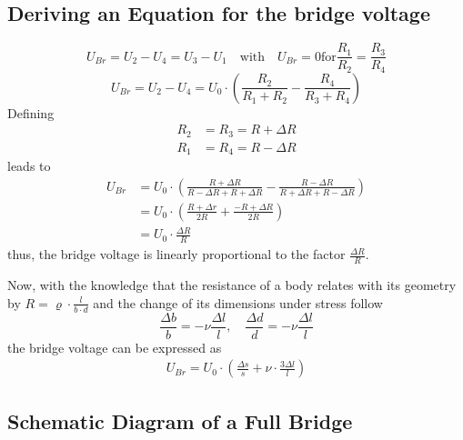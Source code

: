         \subsection{Deriving an Equation for the bridge voltage}\label{sec:A4 equation for full bridge circuit}%
            \begin{equation}
                U_{Br} = U_2 - U_4 = U_3 - U_1 \quad \text{with} \quad U_{Br} = 0 \text{for} \frac{R_1}{R_2} = \frac{R_3}{R_4}
            \end{equation}
            \begin{equation}
                U_{Br} = U_2 - U_4 = U_0 \cdot \left(\frac{R_2}{R_1 + R_2} - \frac{R_4}{R_3 + R_4}\right)
            \end{equation}
            Defining
            \begin{align}
                R_2 &= R_3 = R + \Delta R \\
                R_1 &= R_4 = R - \Delta R
            \end{align}
            leads to
            \begin{align}
                U_{Br}  &= U_0 \cdot \left(\frac{R + \Delta R}{R - \Delta R + R + \Delta R} - \frac{R - \Delta R}{R + \Delta R + R - \Delta R}\right) \nonumber \\
                        &= U_0 \cdot \left(\frac{R+\Delta r}{2R} + \frac{-R + \Delta R}{2R}\right) \nonumber \\
                        &= U_0 \cdot \frac{\Delta R}{R}
                \label{eq:Ubr and delta R}
            \end{align}
            thus, the bridge voltage is linearly proportional to the factor \( \frac{\Delta R}{R} \).\par
            Now, with the knowledge that the resistance of a body relates with its geometry by
            \( R = \varrho \cdot \frac{l}{b \cdot d} \) and the change of its dimensions under stress follow
            \begin{equation}
                \frac{\Delta b}{b} = -\nu \frac{\Delta l}{l}, \quad \frac{\Delta d}{d} = -\nu \frac{\Delta l}{l}
            \end{equation}
            the bridge voltage can be expressed as
            \begin{align}
                U_{Br} = U_0 \cdot \left( \frac{\Delta s}{s} + \nu \cdot \frac{3 \Delta l}{l}\right)
            \end{align}
        \subsection{Schematic Diagram of a Full Bridge}\label{sec:A5 schematic diagram full bridge}%
